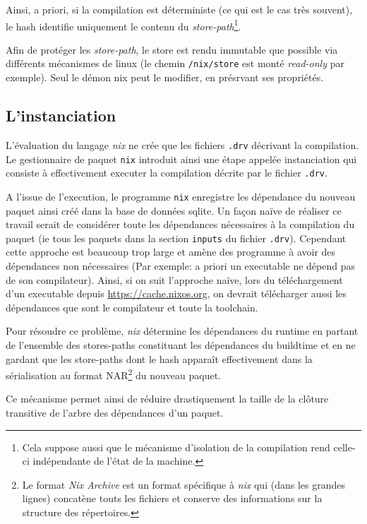 \documentclass[a4paper,12pt]{article}
\begin{document}
Ainsi, a priori, si la compilation est déterministe (ce qui est
le cas très souvent), le hash identifie uniquement le contenu du
\emph{store-path}\footnote{Cela suppose aussi que le mécanisme d'isolation de la
compilation rend celle-ci indépendante de l'état de la machine.}.

Afin de protéger les \emph{store-path}, le store est rendu immutable que
possible via différents mécanismes de linux (le chemin \texttt{/nix/store} est monté
\emph{read-only} par exemple). Seul le démon nix peut le modifier, en présrvant ses
propriétés.

\subsection{L'instanciation}\label{sec:instanciation}

L'évaluation du langage \emph{nix} ne crée que les fichiers \texttt{.drv} décrivant la
compilation. Le gestionnaire de paquet \texttt{nix} introduit ainsi une étape appelée
instanciation qui consiste à effectivement executer la compilation décrite par
le fichier \texttt{.drv}.

A l'issue de l'execution, le programme \texttt{nix} enregistre les dépendance du
nouveau paquet ainsi créé dans la base de données sqlite. Un façon naïve de
réaliser ce travail serait de considérer toute les dépendances nécessaires à la
compilation du paquet (ie tous les paquets dans la section \texttt{inputs} du fichier
\texttt{.drv}). Cependant cette approche est beaucoup trop large et amène des
programme à avoir des dépendances non nécessaires (Par exemple: a priori un
executable ne dépend pas de son compilateur). Ainsi, si on suit l'approche
naïve, lors du téléchargement d'un executable depuis
\url{https://cache.nixos.org}, on devrait télécharger aussi les dépendances que
sont le compilateur et toute la toolchain.

Pour résoudre ce problème, \emph{nix} détermine les dépendances du runtime en
partant de l'ensemble des stores-paths constituant les dépendances du buildtime
et en ne gardant que les store-paths dont le hash apparaît effectivement dans la
sérialisation au format NAR\footnote{Le format \emph{Nix Archive} est un format
spécifique à \emph{nix} qui (dans les grandes lignes) concatène touts les
fichiers et conserve des informations sur la structure des répertoires.} du
nouveau paquet.

Ce mécanisme permet ainsi de réduire drastiquement la taille de la clôture
transitive de l'arbre des dépendances d'un paquet.
\end{document}
